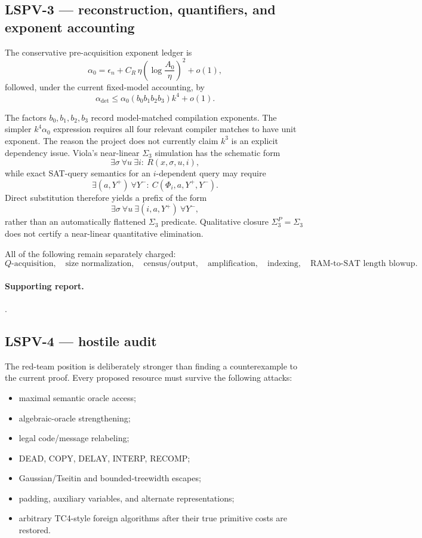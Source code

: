 \documentclass[11pt]{article}
\begin{document}
\subsection{LSPV-3 --- reconstruction, quantifiers, and exponent accounting}

The conservative pre-acquisition exponent ledger is
\[
\alpha_0
=
\epsilon_n+
C_R\,\eta\!\left(\log\frac{A_0}{\eta}\right)^2
+o(1),
\]
followed, under the current fixed-model accounting, by
\[
\boxed{
\alpha_{\mathrm{det}}
\le
\alpha_0(b_0b_1b_2b_3)k^4+o(1).
}
\]

The factors \(b_0,b_1,b_2,b_3\) record model-matched compilation exponents. The simpler
\(k^4\alpha_0\) expression requires all four relevant compiler matches to have unit exponent.
The reason the project does not currently claim \(k^3\) is an explicit dependency issue. Viola's
near-linear \(\Sigma_3\) simulation has the schematic form
\[
\exists \sigma\ \forall u\ \exists i:\ R(x,\sigma,u,i),
\]
while exact SAT-query semantics for an \(i\)-dependent query may require
\[
\exists(a,Y^+)\ \forall Y^-:\ C(\Phi_i,a,Y^+,Y^-).
\]
Direct substitution therefore yields a prefix of the form
\[
\exists\sigma\ \forall u\ \exists(i,a,Y^+)\ \forall Y^-,
\]
rather than an automatically flattened \(\Sigma_3\) predicate. Qualitative closure
\(\Sigma_3^P=\Sigma_3\) does not certify a near-linear quantitative elimination.

All of the following remain separately charged:
\[
Q\text{-acquisition},\quad
\text{size normalization},\quad
\text{census/output},\quad
\text{amplification},\quad
\text{indexing},\quad
\text{RAM-to-SAT length blowup}.
\]

\paragraph{Supporting report.}
.

\subsection{LSPV-4 --- hostile audit}

The red-team position is deliberately stronger than finding a counterexample to the current proof.
Every proposed resource must survive the following attacks:

\begin{itemize}
  \item maximal semantic oracle access;
  \item algebraic-oracle strengthening;
  \item legal code/message relabeling;
  \item DEAD, COPY, DELAY, INTERP, RECOMP;
  \item Gaussian/Tseitin and bounded-treewidth escapes;
  \item padding, auxiliary variables, and alternate representations;
  \item arbitrary TC4-style foreign algorithms after their true primitive costs are restored.
\end{itemize}
\end{document}
